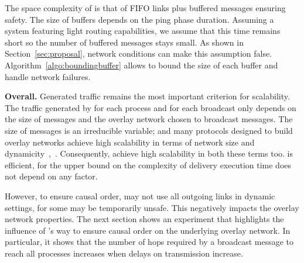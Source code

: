 \noindent The space complexity of \CBROADCAST is that of FIFO links plus
buffered messages ensuring safety. The size of buffers depends on the ping phase
duration. Assuming a system featuring light routing capabilities, we assume that
this time remains short so the number of buffered messages stays small. As shown
in Section~\ref{sec:proposal}, network conditions can make this assumption
false. Algorithm~\ref{algo:boundingbuffer} allows to bound the size of each
buffer and handle network failures.


\noindent \textbf{Overall.}  Generated traffic remains the most important
criterion for scalability. The traffic generated by \CBROADCAST for each process
and for each broadcast only depends on the size of messages and the overlay
network chosen to broadcast messages. The size of messages is an irreducible
variable; and many protocols designed to build overlay networks achieve high
scalability in terms of network size and
dynamicity~\cite{bertier-d2ht,jelasity2007gossip,jelasity2009tman},~\cite{nedelec2017adaptive,voulgaris2005cyclon}.
Consequently, \CBROADCAST achieve high scalability in both these terms
too. \CBROADCAST is efficient, for the upper bound on the complexity of delivery
execution time does not depend on any factor.

However, to ensure causal order, \CBROADCAST may not use all outgoing links in
dynamic settings, for some may be temporarily unsafe. This negatively impacts
the overlay network properties. The next section shows an experiment that
highlights the influence of \CBROADCAST's way to ensure causal order on the
underlying overlay network. In particular, it shows that the number of hops
required by a broadcast message to reach all processes increases when delays on
transmission increase.

